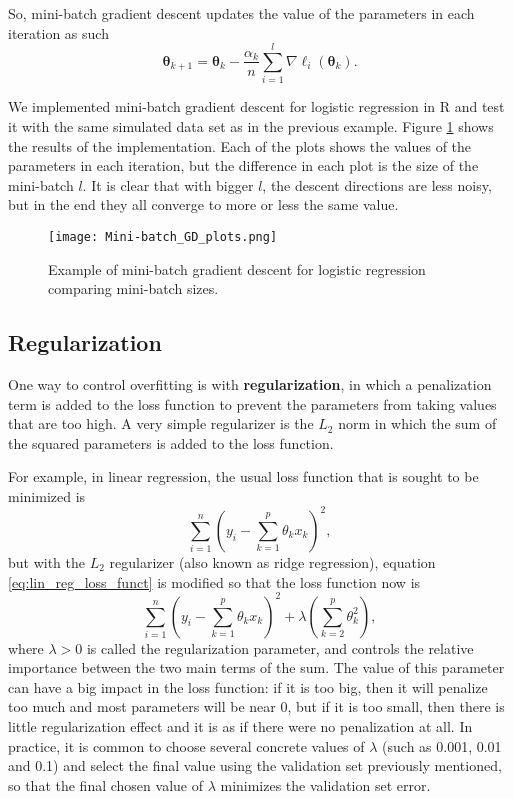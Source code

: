 So, mini-batch gradient descent updates the value of the parameters in each iteration as such
\begin{equation}
  \boldsymbol{\theta}_{k+1} = \boldsymbol{\theta}_k - \frac{\alpha_k}{n} \sum_{i = 1}^l \nabla \ell_i(\boldsymbol{\theta}_k).
\end{equation}

We implemented mini-batch gradient descent for logistic regression in R and test it with the same simulated data set as in the previous example. Figure \ref{fig:Mini-batch_GD_plots} shows the results of the implementation. Each of the plots shows the values of the parameters in each iteration, but the difference in each plot is the size of the mini-batch $l$. It is clear that with bigger $l$, the descent directions are less noisy, but in the end they all converge to more or less the same value.

\begin{figure}[H]
    \centering
    \texttt{[image: Mini-batch\_GD\_plots.png]}
    \caption{Example of mini-batch gradient descent for logistic regression comparing mini-batch sizes.}
    \label{fig:Mini-batch_GD_plots}
\end{figure}


\subsection{Regularization}

One way to control overfitting is with \textbf{regularization}, in which a penalization term is added to the loss function to prevent the parameters from taking values that are too high. A very simple regularizer is the $L_2$ norm in which the sum of the squared parameters is added to the loss function.

For example, in linear regression, the usual loss function that is sought to be minimized is
\begin{equation}
  \label{eq:lin_reg_loss_funct}
  \sum_{i = 1}^n{ \left( y_i - \sum_{k = 1}^p  \theta_k x_k \right) ^ 2},
\end{equation}
but with the $L_2$ regularizer (also known as ridge regression), equation \eqref{eq:lin_reg_loss_funct} is modified so that the loss function now is
\begin{equation}
  \label{eq:lin_reg_loss_funct_reg}
  \sum_{i = 1}^n{ \left( y_i - \sum_{k = 1}^p \theta_k x_k \right) ^ 2}
  + \lambda \left( \sum_{k = 2}^p \theta_k^2 \right),
\end{equation}
where $\lambda > 0$ is called the regularization parameter, and controls the relative importance between the two main terms of the sum. The value of this parameter can have a big impact in the loss function: if it is too big, then it will penalize too much and most parameters will be near 0, but if it is too small, then there is little regularization effect and it is as if there were no penalization at all. In practice, it is common to choose several concrete values of $\lambda$ (such as 0.001, 0.01 and 0.1) and select the final value using the validation set previously mentioned, so that the final chosen value of $\lambda$ minimizes the validation set error.

